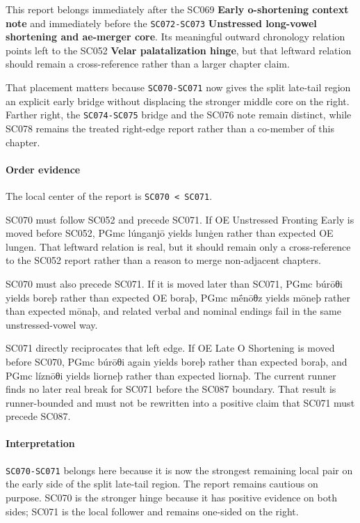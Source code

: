 \documentclass[
  british,
  a4paper,
]{article}
\begin{document}
This report belongs immediately after the SC069 \textbf{Early
o-shortening context note} and immediately before the
\texttt{SC072-SC073} \textbf{Unstressed long-vowel shortening and
ae-merger core}. Its meaningful outward chronology relation points left
to the SC052 \textbf{Velar palatalization hinge}, but that leftward
relation should remain a cross-reference rather than a larger chapter
claim.

That placement matters because \texttt{SC070-SC071} now gives the split
late-tail region an explicit early bridge without displacing the
stronger middle core on the right. Farther right, the
\texttt{SC074-SC075} bridge and the SC076 note remain distinct, while
SC078 remains the treated right-edge report rather than a co-member of
this chapter.

\paragraph{Order evidence}\label{order-evidence-44}

The local center of the report is \texttt{SC070\ \textless{}\ SC071}.

SC070 must follow SC052 and precede SC071. If OE Unstressed Fronting
Early is moved before SC052, PGmc lúnganjō yields lunġen rather than
expected OE lungen. That leftward relation is real, but it should remain
only a cross-reference to the SC052 report rather than a reason to merge
non-adjacent chapters.

SC070 must also precede SC071. If it is moved later than SC071, PGmc
búrōθi yields boreþ rather than expected OE boraþ, PGmc mḗnōθz yields
mōneþ rather than expected mōnaþ, and related verbal and nominal endings
fail in the same unstressed-vowel way.

SC071 directly reciprocates that left edge. If OE Late O Shortening is
moved before SC070, PGmc búrōθi again yields boreþ rather than expected
boraþ, and PGmc líznōθi yields liorneþ rather than expected liornaþ. The
current runner finds no later real break for SC071 before the SC087
boundary. That result is runner-bounded and must not be rewritten into a
positive claim that SC071 must precede SC087.

\paragraph{Interpretation}\label{interpretation-44}

\texttt{SC070-SC071} belongs here because it is now the strongest
remaining local pair on the early side of the split late-tail region.
The report remains cautious on purpose. SC070 is the stronger hinge
because it has positive evidence on both sides; SC071 is the local
follower and remains one-sided on the right.
\end{document}
